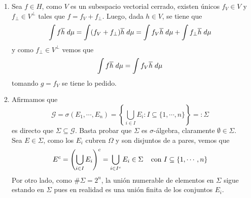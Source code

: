 \documentclass{article}
\begin{document}
\begin{enumerate}
    \item Sea $f\in H$, como $V$ es un subespacio vectorial cerrado, existen únicos $f_{V}\in V$ y 
    $f_{\perp}\in V^{\perp}$ tales que $f=f_{V}+f_{\perp}$. Luego, dada $h\in V$, se tiene que
    \begin{equation*}
        \int f\overline{h}\hspace{1mm}d\mu=\int (f_{V}+f_{\perp})\overline{h}\hspace{1mm}d\mu
        =\int f_{V}\overline{h}\hspace{1mm}d\mu+\int f_{\perp}\overline{h}\hspace{1mm}d\mu
    \end{equation*}
    y como $f_{\perp}\in V^{\perp}$ vemos que
    \begin{equation*}
        \int f\overline{h}\hspace{1mm}d\mu=\int f_{V}\overline{h}\hspace{1mm}d\mu
    \end{equation*}
    tomando $g=f_{V}$ se tiene lo pedido.

    \item Afirmamos que
    \begin{equation*}
        \mathcal{G}=\sigma(E_{1},\cdots,E_{n})=\left\{\bigcup_{i\in I}E_{i}:I\subseteq
        \{1,\cdots,n\}\right\}=:\Sigma
    \end{equation*}
    es directo que $\Sigma\subseteq\mathcal{G}$. Basta probar que $\Sigma$ es $\sigma$-álgebra, 
    claramente $\emptyset\in\Sigma$. Sea $E\in\Sigma$, como los $E_{i}$ cubren $\Omega$ y son 
    disjuntos de a pares, vemos que
    \begin{equation*}
        E^{c}=\left(\bigcup_{i\in I}E_{i}\right)^{c}=\bigcup_{i\in I^{c}}E_{i}\in\Sigma
        \hspace{4mm}\text{con }I\subseteq\{1,\cdots,n\}
    \end{equation*}
    Por otro lado, como $\#\Sigma=2^{n}$, la unión numerable de elementos en $\Sigma$ sigue 
    estando en $\Sigma$ pues en realidad es una unión finita de los conjuntos $E_{i}$. 
    

\end{enumerate}
\end{document}
